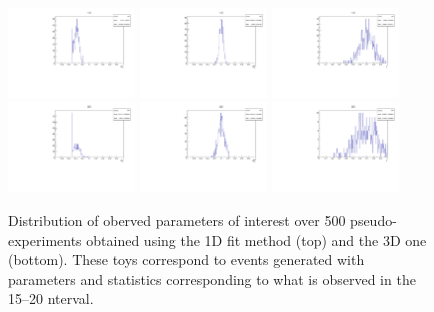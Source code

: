\begin{figure}[h]
\centering
\includegraphics[width=0.3\textwidth]{Lmumu/figs/toys3D/B1/1D/toys3D_afbB.pdf}
\includegraphics[width=0.3\textwidth]{Lmumu/figs/toys3D/B1/1D/toys3D_afb.pdf}
\includegraphics[width=0.3\textwidth]{Lmumu/figs/toys3D/B1/1D/toys3D_fL.pdf} \\
\includegraphics[width=0.3\textwidth]{Lmumu/figs/toys3D/B1/3D/toys3D_afbB.pdf}
\includegraphics[width=0.3\textwidth]{Lmumu/figs/toys3D/B1/3D/toys3D_afb.pdf}
\includegraphics[width=0.3\textwidth]{Lmumu/figs/toys3D/B1/3D/toys3D_fL.pdf} \\
\caption{Distribution of oberved parameters of interest over 500 pseudo-experiments obtained
using the 1D fit method (top) and the 3D one (bottom). These toys correspond to events
generated with parameters and statistics corresponding to what is observed in the 15--20 \qsq nterval. }
\label{fig:3DtoyResults}
\end{figure}
